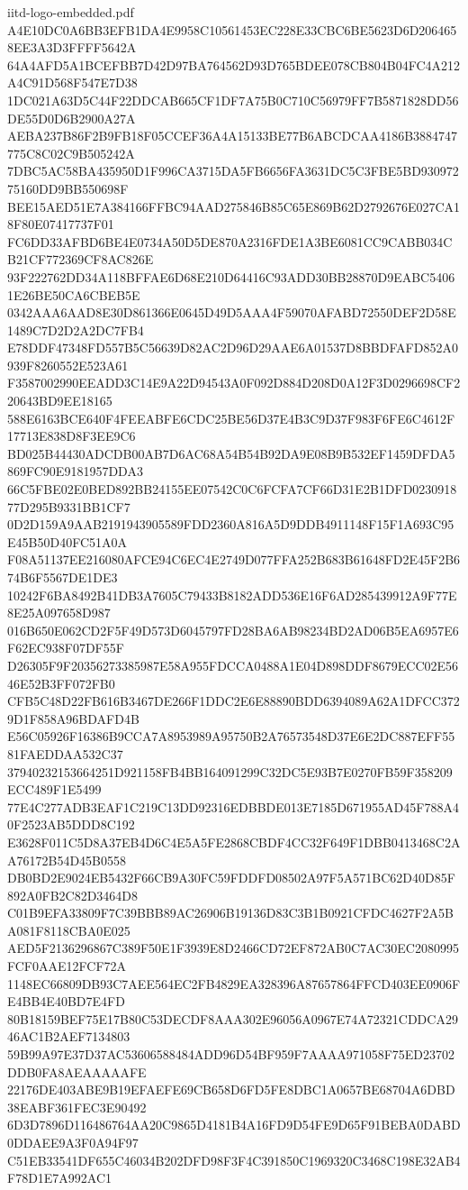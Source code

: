 \begin{filecontents*}[overwrite]{iitd-logo-embedded.pdf}
A4E10DC0A6BB3EFB1DA4E9958C10561453EC228E33CBC6BE5623D6D2064658EE3A3D3FFFF5642A
64A4AFD5A1BCEFBB7D42D97BA764562D93D765BDEE078CB804B04FC4A212A4C91D568F547E7D38
1DC021A63D5C44F22DDCAB665CF1DF7A75B0C710C56979FF7B5871828DD56DE55D0D6B2900A27A
AEBA237B86F2B9FB18F05CCEF36A4A15133BE77B6ABCDCAA4186B3884747775C8C02C9B505242A
7DBC5AC58BA435950D1F996CA3715DA5FB6656FA3631DC5C3FBE5BD93097275160DD9BB550698F
BEE15AED51E7A384166FFBC94AAD275846B85C65E869B62D2792676E027CA18F80E07417737F01
FC6DD33AFBD6BE4E0734A50D5DE870A2316FDE1A3BE6081CC9CABB034CB21CF772369CF8AC826E
93F222762DD34A118BFFAE6D68E210D64416C93ADD30BB28870D9EABC54061E26BE50CA6CBEB5E
0342AAA6AAD8E30D861366E0645D49D5AAA4F59070AFABD72550DEF2D58E1489C7D2D2A2DC7FB4
E78DDF47348FD557B5C56639D82AC2D96D29AAE6A01537D8BBDFAFD852A0939F8260552E523A61
F3587002990EEADD3C14E9A22D94543A0F092D884D208D0A12F3D0296698CF220643BD9EE18165
588E6163BCE640F4FEEABFE6CDC25BE56D37E4B3C9D37F983F6FE6C4612F17713E838D8F3EE9C6
BD025B44430ADCDB00AB7D6AC68A54B54B92DA9E08B9B532EF1459DFDA5869FC90E9181957DDA3
66C5FBE02E0BED892BB24155EE07542C0C6FCFA7CF66D31E2B1DFD023091877D295B9331BB1CF7
0D2D159A9AAB2191943905589FDD2360A816A5D9DDB4911148F15F1A693C95E45B50D40FC51A0A
F08A51137EE216080AFCE94C6EC4E2749D077FFA252B683B61648FD2E45F2B674B6F5567DE1DE3
10242F6BA8492B41DB3A7605C79433B8182ADD536E16F6AD285439912A9F77E8E25A097658D987
016B650E062CD2F5F49D573D6045797FD28BA6AB98234BD2AD06B5EA6957E6F62EC938F07DF55F
D26305F9F20356273385987E58A955FDCCA0488A1E04D898DDF8679ECC02E5646E52B3FF072FB0
CFB5C48D22FB616B3467DE266F1DDC2E6E88890BDD6394089A62A1DFCC3729D1F858A96BDAFD4B
E56C05926F16386B9CCA7A8953989A95750B2A76573548D37E6E2DC887EFF5581FAEDDAA532C37
37940232153664251D921158FB4BB164091299C32DC5E93B7E0270FB59F358209ECC489F1E5499
77E4C277ADB3EAF1C219C13DD92316EDBBDE013E7185D671955AD45F788A40F2523AB5DDD8C192
E3628F011C5D8A37EB4D6C4E5A5FE2868CBDF4CC32F649F1DBB0413468C2AA76172B54D45B0558
DB0BD2E9024EB5432F66CB9A30FC59FDDFD08502A97F5A571BC62D40D85F892A0FB2C82D3464D8
C01B9EFA33809F7C39BBB89AC26906B19136D83C3B1B0921CFDC4627F2A5BA081F8118CBA0E025
AED5F2136296867C389F50E1F3939E8D2466CD72EF872AB0C7AC30EC2080995FCF0AAE12FCF72A
1148EC66809DB93C7AEE564EC2FB4829EA328396A87657864FFCD403EE0906FE4BB4E40BD7E4FD
80B18159BEF75E17B80C53DECDF8AAA302E96056A0967E74A72321CDDCA2946AC1B2AEF7134803
59B99A97E37D37AC53606588484ADD96D54BF959F7AAAA971058F75ED23702DDB0FA8AEAAAAAFE
22176DE403ABE9B19EFAEFE69CB658D6FD5FE8DBC1A0657BE68704A6DBD38EABF361FEC3E90492
6D3D7896D116486764AA20C9865D4181B4A16FD9D54FE9D65F91BEBA0DABD0DDAEE9A3F0A94F97
C51EB33541DF655C46034B202DFD98F3F4C391850C1969320C3468C198E32AB4F78D1E7A992AC1

\end{filecontents*}
